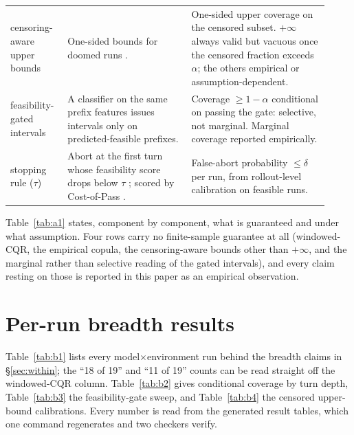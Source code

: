 \documentclass{article}
\begin{document}
\begin{table}[t]
\begin{tabular}{@{}p{0.16\linewidth}p{0.36\linewidth}p{0.40\linewidth}@{}}
    \addlinespace
    censoring-aware upper bounds & One-sided bounds for doomed runs
    \cite{gui2024survival,robins1992ipcw,kaplan1958nonparametric}. & One-sided upper
    coverage on the censored subset. $+\infty$ always valid but vacuous once the
    censored fraction exceeds $\alpha$; the others empirical or assumption-dependent. \\
    \addlinespace
    feasibility-gated intervals & A classifier on the same prefix features issues
    intervals only on predicted-feasible prefixes. & Coverage $\geq 1{-}\alpha$
    conditional on passing the gate: selective, not marginal. Marginal coverage
    reported empirically. \\
    \addlinespace
    stopping rule ($\tau$) & Abort at the first turn whose feasibility score drops
    below $\tau$ \cite{angelopoulos2024risk}; scored by Cost-of-Pass
    \cite{erol2026costofpass}. & False-abort probability $\leq \delta$ per run, from
    rollout-level calibration on feasible runs. \\
    \bottomrule
  \end{tabular}
\end{table}

Table~\ref{tab:a1} states, component by component, what is guaranteed and under what
assumption. Four rows carry no finite-sample guarantee at all (windowed-CQR, the
empirical copula, the censoring-aware bounds other than $+\infty$, and the marginal
rather than selective reading of the gated intervals), and every claim resting on those
is reported in this paper as an empirical observation.

\section{Per-run breadth results}
\label{app:breadth}

Table~\ref{tab:b1} lists every model$\times$environment run behind the breadth claims
in \S\ref{sec:within}; the ``18 of 19'' and ``11 of 19'' counts can be read straight
off the windowed-CQR column. Table~\ref{tab:b2} gives conditional coverage by turn
depth, Table~\ref{tab:b3} the feasibility-gate sweep, and Table~\ref{tab:b4} the
censored upper-bound calibrations. Every number is read from the generated result
tables, which one command regenerates and two checkers verify.
\end{document}
